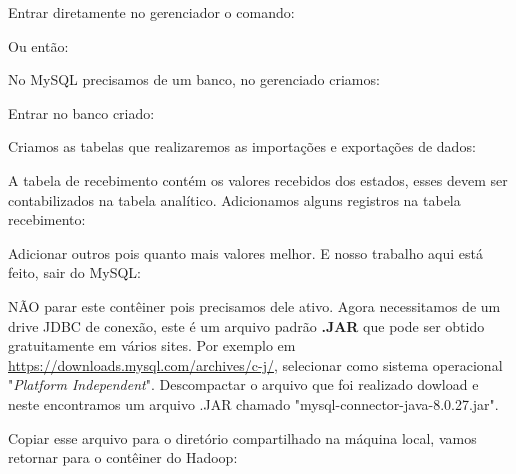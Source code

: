 \documentclass[a4paper,11pt]{article}
\begin{document}
Entrar diretamente no gerenciador o comando: \\

Ou então: \\

No MySQL precisamos de um banco, no gerenciado criamos: \\

Entrar no banco criado:

Criamos as tabelas que realizaremos as importações e exportações de dados: \\

A tabela de recebimento contém os valores recebidos dos estados, esses devem ser contabilizados na tabela analítico. Adicionamos alguns registros na tabela recebimento: \\

Adicionar outros pois quanto mais valores melhor. E nosso trabalho aqui está feito, sair do MySQL: \\

NÃO parar este contêiner pois precisamos dele ativo. Agora necessitamos de um drive JDBC de conexão, este é um arquivo padrão \textbf{.JAR} que pode ser obtido gratuitamente em vários sites. Por exemplo em \url{https://downloads.mysql.com/archives/c-j/}, selecionar como sistema operacional "\textit{Platform Independent}". Descompactar o arquivo que foi realizado dowload e neste encontramos um arquivo .JAR chamado "mysql-connector-java-8.0.27.jar".

Copiar esse arquivo para o diretório compartilhado na máquina local, vamos retornar para o contêiner do Hadoop: \\
\end{document}
